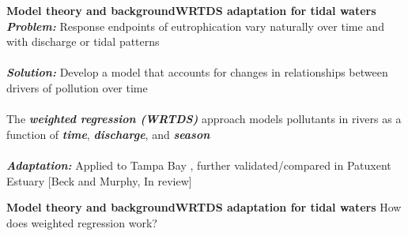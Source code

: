 \documentclass[serif]{beamer}\usepackage[]{graphicx}\usepackage[]{color}
\newcommand{\emtxt}[1]{\textbf{\textit{#1}}}
\begin{document}
\begin{frame}[t]{\textbf{Model theory and background}}{\textbf{WRTDS adaptation for tidal waters}}
\onslide<+->
\emtxt{Problem:} Response endpoints of eutrophication vary naturally over time and with discharge or tidal patterns\\~\\
\emtxt{Solution:} Develop a model that accounts for changes in relationships between drivers of pollution over time\\~\\
\onslide<+->
The \emtxt{weighted regression (WRTDS)} approach models pollutants in rivers as a function of \emtxt{time}, \emtxt{discharge}, and \emtxt{season} \cite{Hirsch10}\\~\\
\onslide<+->
\emtxt{Adaptation:} Applied to Tampa Bay \cite{Beck15}, further validated/compared in Patuxent Estuary [Beck and Murphy, In review]
\end{frame}



\begin{frame}{\textbf{Model theory and background}}{\textbf{WRTDS adaptation for tidal waters}}
How does weighted regression work?
\begin{center}
\end{center}
\end{frame}
 
\end{document}
